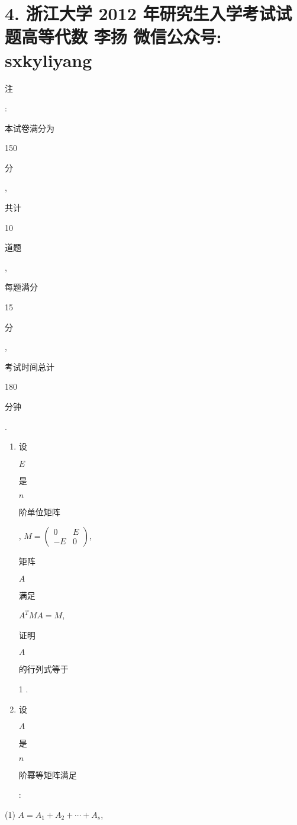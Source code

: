\documentclass[10pt]{article}
\begin{document}
\section{4. 浙江大学 2012 年研究生入学考试试题高等代数 
 李扬 
 微信公众号: sxkyliyang}
\begin{CJK}{UTF8}{mj}注\end{CJK}: \begin{CJK}{UTF8}{mj}本试卷满分为\end{CJK} 150 \begin{CJK}{UTF8}{mj}分\end{CJK}, \begin{CJK}{UTF8}{mj}共计\end{CJK} 10 \begin{CJK}{UTF8}{mj}道题\end{CJK}, \begin{CJK}{UTF8}{mj}每题满分\end{CJK} 15 \begin{CJK}{UTF8}{mj}分\end{CJK}, \begin{CJK}{UTF8}{mj}考试时间总计\end{CJK} 180 \begin{CJK}{UTF8}{mj}分钟\end{CJK}.

\begin{enumerate}
  \item \begin{CJK}{UTF8}{mj}设\end{CJK} $E$ \begin{CJK}{UTF8}{mj}是\end{CJK} $n$ \begin{CJK}{UTF8}{mj}阶单位矩阵\end{CJK}, $M=\left(\begin{array}{cc}0 & E \\ -E & 0\end{array}\right)$, \begin{CJK}{UTF8}{mj}矩阵\end{CJK} $A$ \begin{CJK}{UTF8}{mj}满足\end{CJK} $A^{T} M A=M$, \begin{CJK}{UTF8}{mj}证明\end{CJK} $A$ \begin{CJK}{UTF8}{mj}的行列式等于\end{CJK} 1 .

  \item \begin{CJK}{UTF8}{mj}设\end{CJK} $A$ \begin{CJK}{UTF8}{mj}是\end{CJK} $n$ \begin{CJK}{UTF8}{mj}阶幂等矩阵满足\end{CJK}:

\end{enumerate}
(1) $A=A_{1}+A_{2}+\cdots+A_{s}$,
\end{document}
